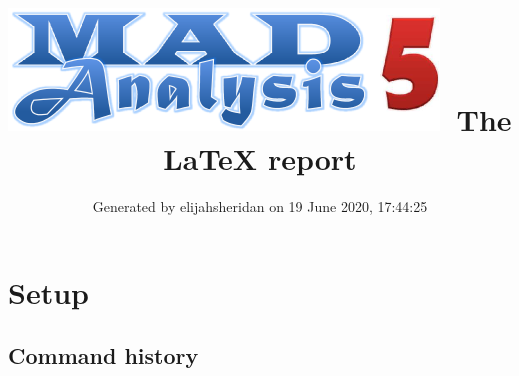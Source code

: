 \documentclass[a4paper, 10pt]{article}
\title{{\includegraphics[scale=.4]{logo.png}}\ The LaTeX report}
\author{Generated by elijahsheridan on 19 June 2020, 17:44:25}
\begin{document}
\maketitle
\flushbottom

\newpage
\section{ Setup}

\subsection{ Command history}
\end{document}
